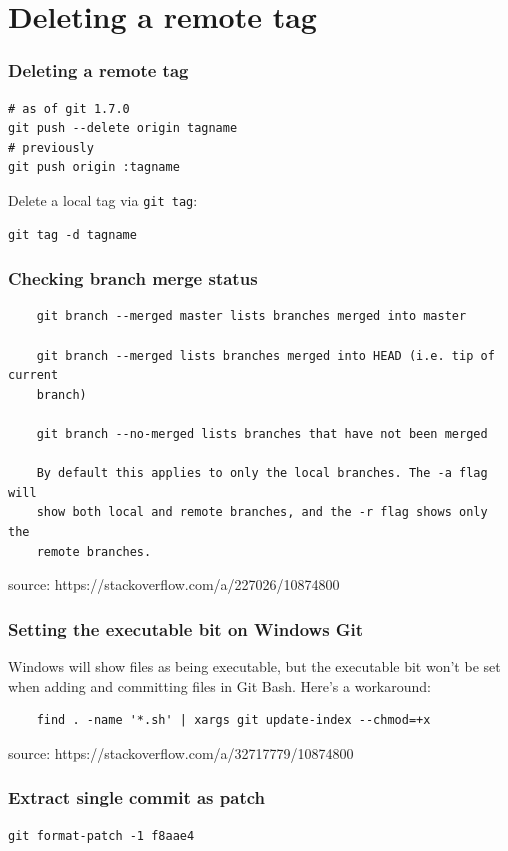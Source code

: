 \documentclass{git_course}
\begin{document}
\section{Deleting a remote tag}

\begin{frame}[fragile]
\frametitle{Deleting a remote tag}

\begin{lstlisting}
# as of git 1.7.0
git push --delete origin tagname
# previously
git push origin :tagname
\end{lstlisting}

Delete a local tag via \texttt{git tag}:
\begin{lstlisting}
git tag -d tagname
\end{lstlisting}
\end{frame}

\begin{frame}[fragile]
\frametitle{Checking branch merge status}
    \begin{lstlisting}
    git branch --merged master lists branches merged into master

    git branch --merged lists branches merged into HEAD (i.e. tip of current
    branch)

    git branch --no-merged lists branches that have not been merged

    By default this applies to only the local branches. The -a flag will
    show both local and remote branches, and the -r flag shows only the
    remote branches.
    \end{lstlisting}
    source: https://stackoverflow.com/a/227026/10874800
\end{frame}

\begin{frame}[fragile]
\frametitle{Setting the executable bit on Windows Git}
Windows will show files as being executable, but the executable bit won't be
set when adding and committing files in Git Bash.  Here's a workaround:
    \begin{lstlisting}
    find . -name '*.sh' | xargs git update-index --chmod=+x
    \end{lstlisting}
    source: https://stackoverflow.com/a/32717779/10874800
\end{frame}

\begin{frame}[fragile]
\frametitle{Extract single commit as patch}
\begin{lstlisting}
git format-patch -1 f8aae4
\end{lstlisting}
\end{frame}
\end{document}
